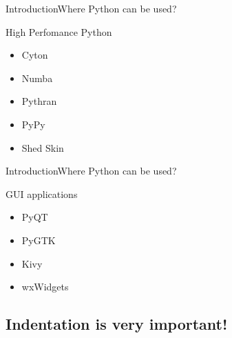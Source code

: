 \documentclass[10pt]{beamer}
\begin{document}
\begin{frame}{Introduction}{Where Python can be used?}
	
	\begin{block}{High Perfomance Python}
		\begin{itemize}
			\item Cyton
			
			\item Numba
			
			\item Pythran
			
			\item PyPy
			
			\item Shed Skin
		\end{itemize}
		
	\end{block}
\end{frame}

\begin{frame}{Introduction}{Where Python can be used?}
	
	\begin{block}{GUI applications}
		\begin{itemize}
			\item PyQT
			
			\item PyGTK
			
			\item Kivy
			
			\item wxWidgets
	
		\end{itemize}
		
	\end{block}
\end{frame}

\subsection{Indentation is very important!}
\end{document}
